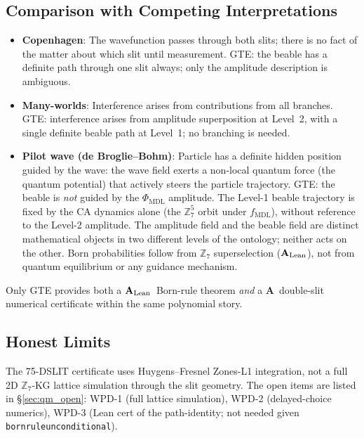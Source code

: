 \documentclass[11pt,openany]{book}
\theoremstyle{remark}
\newcommand{\MDL}{\text{MDL}}
\newcommand{\lean}[1]{%
  \penalty-100
  \begingroup\def\_{\textunderscore\allowbreak}\texttt{#1}\endgroup}
\newcommand{\CatA}{\textbf{A}}
\newcommand{\CatAL}{\ensuremath{\textbf{A}_{\rm Lean}}}
\begin{document}
\subsection*{Comparison with Competing Interpretations}

\begin{itemize}

\item \textbf{Copenhagen}: The wavefunction passes through both slits; there is no fact
  of the matter about which slit until measurement.  GTE: the beable has a definite
  path through one slit always; only the amplitude description is ambiguous.

\item \textbf{Many-worlds}: Interference arises from contributions from all branches.
  GTE: interference arises from amplitude superposition at Level~2, with a single
  definite beable path at Level~1; no branching is needed.

\item \textbf{Pilot wave (de Broglie--Bohm)}: Particle has a definite hidden position
  guided by the wave: the wave field exerts a non-local quantum force (the quantum
  potential) that actively steers the particle trajectory.  GTE: the beable is \emph{not}
  guided by the $\Phi_{\MDL}$ amplitude.  The Level-1 beable trajectory is fixed by
  the CA dynamics alone (the $\mathbb{Z}_7^5$ orbit under $f_{\MDL}$), without reference
  to the Level-2 amplitude.  The amplitude field and the beable field are distinct
  mathematical objects in two different levels of the ontology; neither acts on the other.
  Born probabilities follow from $\mathbb{Z}_7$ superselection (\CatAL), not from
  quantum equilibrium or any guidance mechanism.

\end{itemize}

Only GTE provides both a \CatAL\ Born-rule theorem \emph{and} a \CatA\ double-slit
numerical certificate within the same polynomial story.

\subsection*{Honest Limits}

The 75-DSLIT certificate uses Huygens--Fresnel Zones-L1 integration, not a full 2D
$\mathbb{Z}_7$-KG lattice simulation through the slit geometry.  The open items are
listed in §\ref{sec:qm_open}: WPD-1 (full lattice simulation), WPD-2 (delayed-choice
numerics), WPD-3 (Lean cert of the path-identity; not needed given
\lean{born\_rule\_unconditional}).
\end{document}
